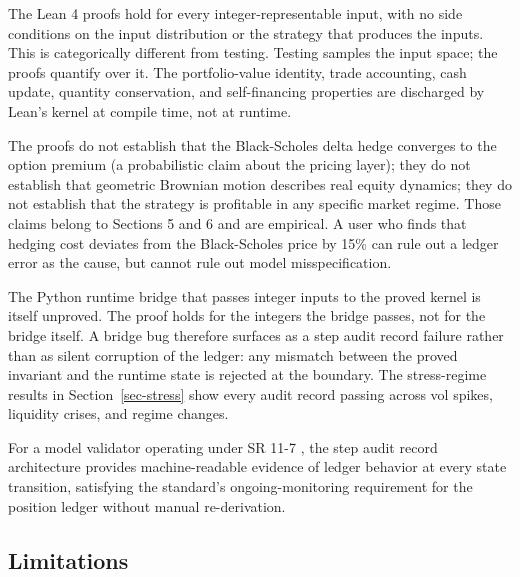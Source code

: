 \documentclass[
  11pt,
  letterpaper,
  DIV=12,
  numbers=noendperiod]{scrartcl}
\numberwithin{equation}{section}
\numberwithin{figure}{section}
\numberwithin{table}{section}
\begin{document}
The Lean 4 proofs hold for every integer-representable input, with no
side conditions on the input distribution or the strategy that produces
the inputs. This is categorically different from testing. Testing
samples the input space; the proofs quantify over it. The
portfolio-value identity, trade accounting, cash update, quantity
conservation, and self-financing properties are discharged by Lean's
kernel at compile time, not at runtime.

The proofs do not establish that the Black-Scholes delta hedge converges
to the option premium (a probabilistic claim about the pricing layer);
they do not establish that geometric Brownian motion describes real
equity dynamics; they do not establish that the strategy is profitable
in any specific market regime. Those claims belong to Sections 5 and 6
and are empirical. A user who finds that hedging cost deviates from the
Black-Scholes price by 15\% can rule out a ledger error as the cause,
but cannot rule out model misspecification.

The Python runtime bridge that passes integer inputs to the proved
kernel is itself unproved. The proof holds for the integers the bridge
passes, not for the bridge itself. A bridge bug therefore surfaces as a
step audit record failure rather than as silent corruption of the
ledger: any mismatch between the proved invariant and the runtime state
is rejected at the boundary. The stress-regime results in
Section~\ref{sec-stress} show every audit record passing across vol
spikes, liquidity crises, and regime changes.

For a model validator operating under SR 11-7 , the step audit
record architecture provides machine-readable evidence of ledger
behavior at every state transition, satisfying the standard's
ongoing-monitoring requirement for the position ledger without manual
re-derivation.

\subsection{Limitations}\label{sec-limitations}
\end{document}
